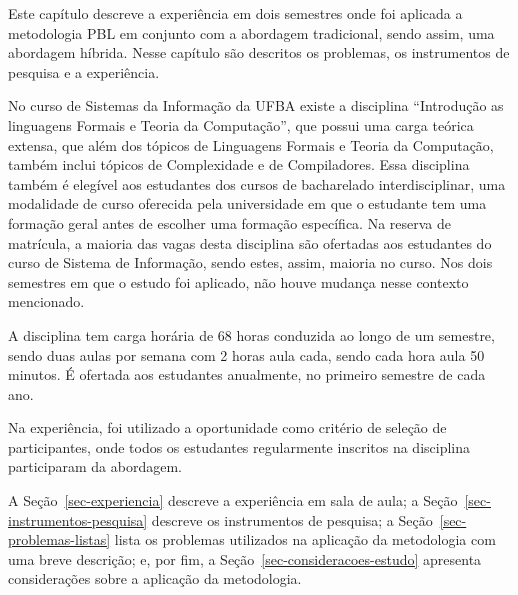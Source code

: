 
\label{cap-estudo}
\acresetall
Este capítulo descreve a experiência em dois semestres onde foi aplicada a metodologia \ac{PBL}
em conjunto com a abordagem tradicional, sendo assim, uma abordagem híbrida.
Nesse capítulo são descritos os problemas, os instrumentos de pesquisa e a
experiência.

No curso de Sistemas da Informação da \ac{UFBA} existe
a disciplina ``Introdução as linguagens Formais e Teoria da Computação'',
que possui uma carga teórica extensa, que além dos tópicos de Linguagens Formais e Teoria
da Computação, também inclui tópicos de Complexidade e de Compiladores.
Essa disciplina também é elegível aos estudantes dos cursos de bacharelado
interdisciplinar, uma modalidade de curso oferecida pela universidade
em que o estudante tem uma formação geral antes de escolher
uma formação específica.
Na reserva de matrícula, a maioria das vagas desta disciplina são ofertadas aos
estudantes do curso de Sistema de Informação, sendo estes, assim, maioria no curso.
Nos dois semestres em que o estudo foi aplicado, não houve mudança nesse
contexto mencionado.

A disciplina tem carga horária de 68 horas conduzida ao longo de um semestre, sendo duas
aulas por semana com 2 horas aula cada, sendo cada hora aula 50 minutos.
É ofertada aos estudantes anualmente, no primeiro semestre de cada ano.

Na experiência, foi utilizado a oportunidade como critério de seleção de participantes, onde todos os
estudantes regularmente inscritos na disciplina participaram da abordagem.

A Seção~\ref{sec-experiencia} descreve a experiência em sala de aula;
a Seção~\ref{sec-instrumentos-pesquisa} descreve os instrumentos de pesquisa;
a Seção~\ref{sec-problemas-listas} lista os problemas utilizados
na aplicação da metodologia com uma breve
descrição;
e, por fim, a Seção~\ref{sec-consideracoes-estudo} apresenta
considerações sobre a aplicação da metodologia.





